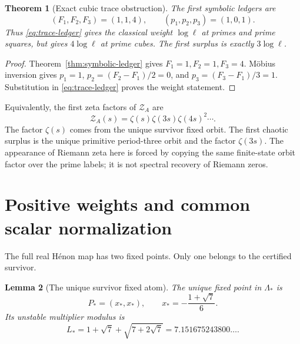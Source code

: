 \documentclass[11pt]{article}
\numberwithin{equation}{section}
\newtheorem{theorem}{Theorem}[section]
\newtheorem{lemma}[theorem]{Lemma}
\theoremstyle{remark}
\newcommand{\cZ}{\mathcal Z}
\newcommand{\Lam}{\Lambda}
\begin{document}
\begin{theorem}[Exact cubic trace obstruction]
\label{thm:cubic-obstruction}
The first symbolic ledgers are
\begin{equation}
 (F_1,F_2,F_3)=(1,1,4),
 \qquad
 (p_1,p_2,p_3)=(1,0,1).
 \label{eq:first-ledgers}
\end{equation}
Thus \eqref{eq:trace-ledger} gives the classical weight \(\log\ell\) at
primes and prime squares, but gives \(4\log\ell\) at prime cubes.  The first
surplus is exactly \(3\log\ell\).
\end{theorem}

\begin{proof}
Theorem~\ref{thm:symbolic-ledger} gives \(F_1=1,F_2=1,F_3=4\).
M\"obius inversion gives
\(
p_1=1
\),
\(
p_2=(F_2-F_1)/2=0
\), and
\(
p_3=(F_3-F_1)/3=1
\).  Substitution in \eqref{eq:trace-ledger} proves the weight statement.
\end{proof}

Equivalently, the first zeta factors of \(\cZ_A\) are
\begin{equation}
 \cZ_A(s)=\zeta(s)\zeta(3s)\zeta(4s)^2\cdots.
 \label{eq:first-zeta-factors}
\end{equation}
The factor \(\zeta(s)\) comes from the unique survivor fixed orbit.  The first
chaotic surplus is the unique primitive period-three orbit and the factor
\(\zeta(3s)\).  The appearance of Riemann zeta here is forced by copying the
same finite-state orbit factor over the prime labels; it is not spectral
recovery of Riemann zeros.

\section{Positive weights and common scalar normalization}

The full real H\'enon map has two fixed points.  Only one belongs to the
certified survivor.

\begin{lemma}[The unique survivor fixed atom]
\label{lem:fixed-atom}
The unique fixed point in \(\Lam_*\) is
\begin{equation}
 P_*=(x_*,x_*),
 \qquad
 x_*=-\frac{1+\sqrt7}{6}.
 \label{eq:fixed-point}
\end{equation}
Its unstable multiplier modulus is
\begin{equation}
 L_*=1+\sqrt7+\sqrt{7+2\sqrt7}
 =7.151675243800\ldots.
 \label{eq:fixed-multiplier}
\end{equation}
\end{lemma}
\end{document}
